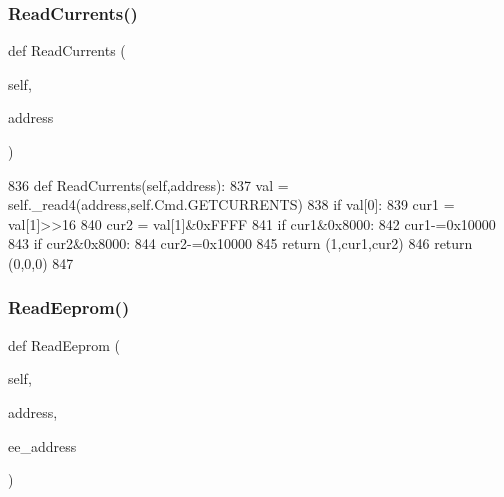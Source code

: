 \subsubsection{\texorpdfstring{Read\+Currents()}{ReadCurrents()}}
{\footnotesize\ttfamily def Read\+Currents (\begin{DoxyParamCaption}\item[{}]{self,  }\item[{}]{address }\end{DoxyParamCaption})}


\begin{DoxyCode}
836     \textcolor{keyword}{def }ReadCurrents(self,address):
837         val = self.\_read4(address,self.Cmd.GETCURRENTS)
838         \textcolor{keywordflow}{if} val[0]:
839             cur1 = val[1]>>16
840             cur2 = val[1]&0xFFFF
841             \textcolor{keywordflow}{if} cur1&0x8000:
842                 cur1-=0x10000
843             \textcolor{keywordflow}{if} cur2&0x8000:
844                 cur2-=0x10000
845             \textcolor{keywordflow}{return} (1,cur1,cur2)
846         \textcolor{keywordflow}{return} (0,0,0)
847 
\end{DoxyCode}
\mbox{\label{classtoxic__hardware_1_1roboclaw__3_1_1Roboclaw_a3a5b1ed034fb270714ac6a8e05d02cfa}} 
\subsubsection{\texorpdfstring{Read\+Eeprom()}{ReadEeprom()}}
{\footnotesize\ttfamily def Read\+Eeprom (\begin{DoxyParamCaption}\item[{}]{self,  }\item[{}]{address,  }\item[{}]{ee\+\_\+address }\end{DoxyParamCaption})}


